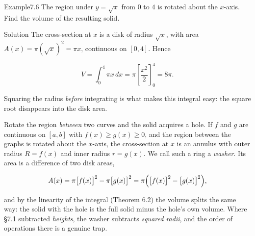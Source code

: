 \documentclass[a4paper,12pt,oneside]{memoir}
\begin{document}
\begin{workedexample}
\begin{envexample}{Example}{7.6}{}
The region under \(y = \sqrt{x}\) from \(0\) to \(4\) is rotated about the \(x\)-axis. Find the volume of the resulting solid.
\end{envexample}
\begin{envsolution}{Solution}{}{}
The cross-section at \(x\) is a disk of radius \(\sqrt{x}\), with area \(A(x) = \pi (\sqrt{x})^{2} = \pi x\), continuous on \([0, 4]\). Hence

\[ V = \int_{0}^{4} \pi x\,dx = \pi \left[\frac{x^{2}}{2}\right]_{0}^{4} = 8\pi. \]

Squaring the radius \emph{before} integrating is what makes this integral easy: the square root disappears into the disk area. \qedmark
\end{envsolution}
\end{workedexample}
Rotate the region \emph{between} two curves and the solid acquires a hole. If \(f\) and \(g\) are continuous on \([a, b]\) with \(f(x) \ge g(x) \ge 0\), and the region between the graphs is rotated about the \(x\)-axis, the cross-section at \(x\) is an annulus with outer radius \(R = f(x)\) and inner radius \(r = g(x)\). We call such a ring a \emph{washer}. Its area is a difference of two disk areas,

\[ A(x) = \pi \bigl[f(x)\bigr]^{2} - \pi \bigl[g(x)\bigr]^{2} = \pi \Bigl(\bigl[f(x)\bigr]^{2} - \bigl[g(x)\bigr]^{2}\Bigr), \]

and by the linearity of the integral (Theorem 6.2) the volume splits the same way: the solid with the hole is the full solid minus the hole’s own volume. Where §7.1 subtracted \emph{heights}, the washer subtracts \emph{squared radii}, and the order of operations there is a genuine trap.
\end{document}
